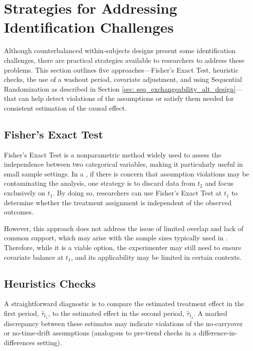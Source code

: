 \section{Strategies for Addressing Identification Challenges}
\label{sec: what_can_we_do}

Although counterbalanced within‐subjects designs present some identification challenges, there are practical strategies available to researchers to address these problems. This section outlines five approaches—Fisher's Exact Test, heuristic checks, the use of a washout period, covariate adjustment, and using Sequential Randomization as described in Section \ref{sec: seq_exchangeability_alt_design}—that can help detect violations of the assumptions or satisfy them needed for consistent estimation of the causal effect.

\subsection{Fisher's Exact Test}

Fisher's Exact Test is a nonparametric method widely used to assess the independence between two categorical variables, making it particularly useful in small sample settings. In a \cwsd{}, if there is concern that assumption violations may be contaminating the analysis, one strategy is to discard data from $t_2$ and focus exclusively on $t_1$. By doing so, researchers can use Fisher's Exact Test at $t_1$ to determine whether the treatment assignment is independent of the observed outcomes.

However, this approach does not address the issue of limited overlap and lack of common support, which may arise with the sample sizes typically used in \cwsd{}. Therefore, while it is a viable option, the experimenter may still need to ensure covariate balance at $t_1$, and its applicability may be limited in certain contexts.

\subsection{Heuristics Checks}

A straightforward diagnostic is to compare the estimated treatment effect in the first period, \(\hat{\tau}_{t_1}\), to the estimated effect in the second period, \(\hat{\tau}_{t_2}\). A marked discrepancy between these estimates may indicate violations of the no‐carryover or no‐time‐drift assumptions (analogous to pre‐trend checks in a difference‐in‐differences setting).

